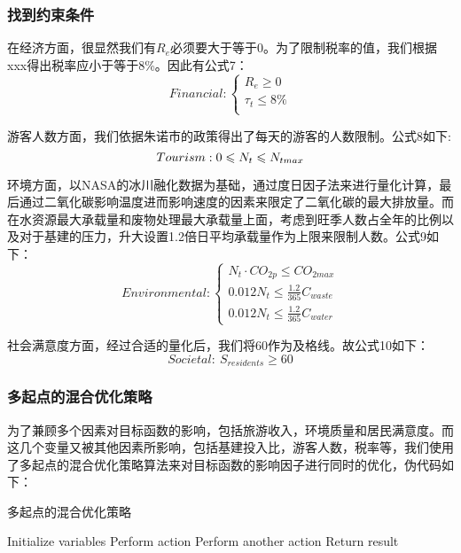 \documentclass[12pt]{article}  %
\begin{document}
\subsubsection{找到约束条件}
在经济方面，很显然我们有$R_e$必须要大于等于0。为了限制税率的值，我们根据xxx得出税率应小于等于8\%。因此有公式7：
\begin{equation}
	Financial:
	\begin{cases}
		R_{e}\geqslant 0 \\
		\tau_{t}\leqslant 8\% \\
	\end{cases}
\end{equation}

游客人数方面，我们依据朱诺市的政策\cite{6}得出了每天的游客的人数限制。公式8如下:
\begin{equation}
	Tourism:
		0\leqslant N_{t}\leqslant N_{tmax}\\
\end{equation}

环境方面，以NASA的冰川融化数据\cite{7}为基础，通过度日因子法来进行量化计算，最后通过二氧化碳影响温度进而影响速度的因素来限定了二氧化碳的最大排放量。而在水资源最大承载量和废物处理最大承载量上面，考虑到旺季人数占全年的比例以及对于基建的压力，升大设置1.2倍日平均承载量作为上限来限制人数。公式9如下：
\begin{equation}
	Environmental:
	\begin{cases}
		N_{t}\cdot CO_{2p}\leqslant CO_{2max} \\
		0.012N_t\leqslant \frac{1.2}{365}C_{waste} \\
		0.012N_t\leqslant \frac{1.2}{365}C_{water}
	\end{cases}
\end{equation}

社会满意度方面，经过合适的量化后，我们将60作为及格线。故公式10如下：
\begin{equation}
	Societal:\ S_{residents} \geqslant 60
\end{equation}	
\subsubsection{多起点的混合优化策略}
为了兼顾多个因素对目标函数的影响，包括旅游收入，环境质量和居民满意度。而这几个变量又被其他因素所影响，包括基建投入比，游客人数，税率等，我们使用了多起点的混合优化策略算法来对目标函数的影响因子进行同时的优化，伪代码如下：
\begin{algorithm}
	\caption{多起点的混合优化策略}
	\begin{algorithmic}[1]
		\STATE Initialize variables
				\STATE Perform action
			\ELSE
				\STATE Perform another action
			\ENDIF
		\ENDFOR
		\STATE Return result
	\end{algorithmic}
\end{algorithm}
\end{document}
